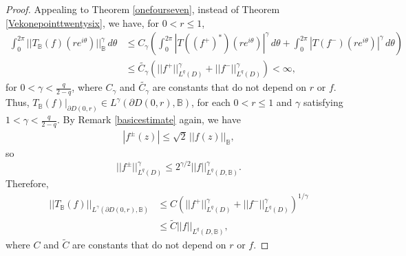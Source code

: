 \documentclass[suppldata]{interact}
\theoremstyle{plain}%
\theoremstyle{definition}
\theoremstyle{remark}
\newcommand{\p}{\partial}
\newcommand{\bc}{\mathbb{B}}
\begin{document}
\begin{proof}
    Appealing to Theorem \ref{onefourseven}, instead of Theorem \ref{Vekonepointtwentysix},  we have, for $0 < r \leq 1$, 
    \begin{align*}
    	\int_{0}^{2\pi} ||T_\bc(f)(re^{i\theta})||_{\bc}^\gamma\,d\theta
	&\leq C_\gamma\left( \int_{0}^{2\pi} |T((f^+)^*)(re^{i\theta}) |^\gamma \,d\theta+ \int_{0}^{2\pi} |T(f^-)(re^{i\theta})|^\gamma \,d\theta\right) \\
	&\leq \tilde{C_\gamma}\left( ||f^+ ||_{L^q(D)}^\gamma + ||f^- ||_{L^q(D)}^\gamma \right) < \infty,
    \end{align*}
    for $0 < \gamma< \frac{q}{2-q}$, where $C_\gamma$ and $\tilde{C_\gamma}$ are constants that do not depend on $r$ or $f$.   Thus, $T_\bc(f)|_{\p D(0,r)} \in L^\gamma(\p D(0,r), \bc)$, for each $0 < r\leq 1$ and $\gamma$ satisfying $1 < \gamma < \frac{q}{2-q}$. By Remark \ref{basicestimate} again, we have
    \begin{align*}
     |f^\pm(z)| \leq \sqrt{2}\, ||f(z)||_{\bc},
    \end{align*}
  so
  \[
  	||f^\pm ||_{L^q(D)}^\gamma \leq 2^{\gamma/2} ||f ||_{L^q(D,\bc)}^\gamma.
  \]
  Therefore, 
    \begin{align*}
    		||T_{\bc}(f)||_{L^\gamma(\p D(0,r),\bc)} 
		&\leq  C \left( ||f^+ ||_{L^q(D)}^\gamma + ||f^- ||_{L^q(D)}^\gamma \right)^{1/\gamma} \\
		&\leq \tilde{C} ||f||_{L^q(D,\bc)},
    \end{align*}
   where $C$ and $\tilde{C}$ are constants that do not depend on $r$ or $f$. 
   

\end{proof}
\end{document}
